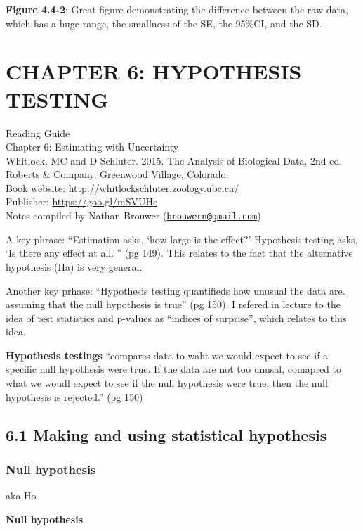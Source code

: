 \documentclass[]{book}
\theoremstyle{definition}
\theoremstyle{definition}
\theoremstyle{definition}
\theoremstyle{remark}
\begin{document}
\textbf{Figure 4.4-2}: Great figure demonstrating the difference between
the raw data, which has a huge range, the smallness of the SE, the
95\%CI, and the SD.

\chapter{CHAPTER 6: HYPOTHESIS
TESTING}\label{chapter-6-hypothesis-testing}

Reading Guide\\
Chapter 6: Estimating with Uncertainty\\
Whitlock, MC and D Schluter. 2015. The Analysis of Biological Data, 2nd
ed. Roberts \& Company, Greenwood Village, Colorado.\\
Book website: \url{http://whitlockschluter.zoology.ubc.ca/}\\
Publisher: \url{https://goo.gl/mSVUHe}\\
Notes compiled by Nathan Brouwer
(\href{mailto:brouwern@gmail.com}{\nolinkurl{brouwern@gmail.com}})

A key phrase: ``Estimation asks, `how large is the effect?' Hypothesis
testing asks, `Is there any effect at all.'\,'' (pg 149). This relates
to the fact that the alternative hypothesis (Ha) is very general.

Another key prhase: ``Hypothesis testing quantifieds how unusual the
data are. assuming that the null hypothesis is true'' (pg 150). I
refered in lecture to the idea of test statistics and p-values as
``indices of surprise'', which relates to this idea.

\textbf{Hypothesis testings} ``compares data to waht we would expect to
see if a specific null hypothesis were true. If the data are not too
unusal, comapred to what we woudl expect to see if the null hypothesis
were true, then the null hypothesis is rejected.'' (pg 150)

\section{6.1 Making and using statistical
hypothesis}\label{making-and-using-statistical-hypothesis}

\subsection{Null hypothesis}\label{null-hypothesis}

aka Ho

\textbf{Null hypothesis}
\end{document}
